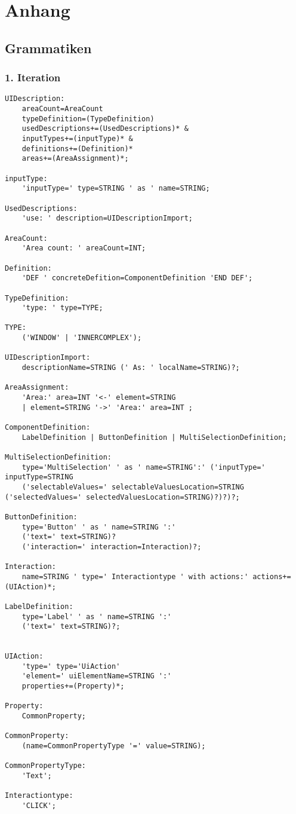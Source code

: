 \chapter{Anhang}
\section*{Grammatiken}\label{AppGrammatiken}
\subsection*{1. Iteration}
\begin{lstlisting}
UIDescription:
	areaCount=AreaCount
	typeDefinition=(TypeDefinition)
	usedDescriptions+=(UsedDescriptions)* &
	inputTypes+=(inputType)* &
	definitions+=(Definition)*
	areas+=(AreaAssignment)*;

inputType:
	'inputType=' type=STRING ' as ' name=STRING;

UsedDescriptions:
	'use: ' description=UIDescriptionImport;

AreaCount:
	'Area count: ' areaCount=INT;

Definition:
	'DEF ' concreteDefition=ComponentDefinition 'END DEF';

TypeDefinition:
	'type: ' type=TYPE;

TYPE:
	('WINDOW' | 'INNERCOMPLEX');

UIDescriptionImport:
	descriptionName=STRING (' As: ' localName=STRING)?;

AreaAssignment:
	'Area:' area=INT '<-' element=STRING
	| element=STRING '->' 'Area:' area=INT ;

ComponentDefinition:
	LabelDefinition | ButtonDefinition | MultiSelectionDefinition;

MultiSelectionDefinition:
	type='MultiSelection' ' as ' name=STRING':' ('inputType=' inputType=STRING
	('selectableValues=' selectableValuesLocation=STRING ('selectedValues=' selectedValuesLocation=STRING)?)?)?;

ButtonDefinition:
	type='Button' ' as ' name=STRING ':'
	('text=' text=STRING)?
	('interaction=' interaction=Interaction)?;

Interaction:
	name=STRING ' type=' Interactiontype ' with actions:' actions+=(UIAction)*;

LabelDefinition:
	type='Label' ' as ' name=STRING ':'
	('text=' text=STRING)?;


UIAction:
	'type=' type='UiAction'
	'element=' uiElementName=STRING ':'
	properties+=(Property)*;

Property:
	CommonProperty;

CommonProperty:
	(name=CommonPropertyType '=' value=STRING);

CommonPropertyType:
	'Text';

Interactiontype:
	'CLICK';
\end{lstlisting}

